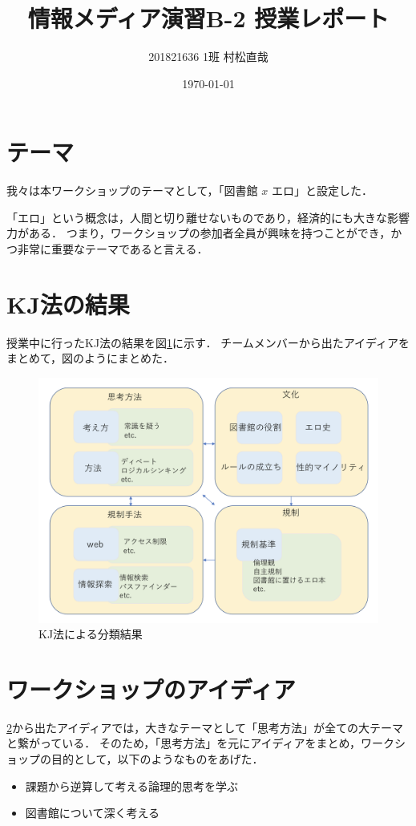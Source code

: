 \documentclass[pdflatex,ja=standard]{bxjsarticle}
\title{情報メディア演習B-2 授業レポート}
\author{201821636 1班 村松直哉}
\date{\today}
\begin{document}
\maketitle
%
%
\section{テーマ}
我々は本ワークショップのテーマとして，「図書館 $x$ エロ」と設定した．

「エロ」という概念は，人間と切り離せないものであり，経済的にも大きな影響力がある．
つまり，ワークショップの参加者全員が興味を持つことができ，かつ非常に重要なテーマであると言える．


\section{KJ法の結果} \label{sec:kj}
授業中に行ったKJ法の結果を図\ref{fig:result}に示す．
チームメンバーから出たアイディアをまとめて，図のようにまとめた．

\begin{figure}[htb]
\begin{center}
    \includegraphics[width=14cm]{figs/result.png}
\end{center}
\caption{KJ法による分類結果}
\label{fig:result}
\end{figure}


\section{ワークショップのアイディア}
\ref{sec:kj}から出たアイディアでは，大きなテーマとして「思考方法」が全ての大テーマと繋がっている．
そのため，「思考方法」を元にアイディアをまとめ，ワークショップの目的として，以下のようなものをあげた．
\begin{itemize}
    \item 課題から逆算して考える論理的思考を学ぶ
    \item 図書館について深く考える
\end{itemize}
\end{document}
